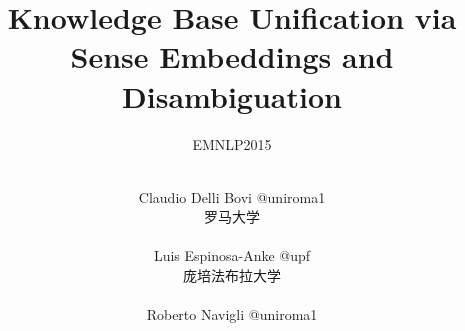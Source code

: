 \documentclass[xcolor=svgnames,dvipsnames,table, hyperref=pdftex, mathserif, presentation]{beamer}
\begin{document}
 
\title[KB Unification]{Knowledge Base Unification via Sense Embeddings and Disambiguation\\
}
\subtitle{EMNLP2015}

\author[Zhe Han]{\\ 
Claudio Delli Bovi @uniroma1 \begin{footnotesize}罗马大学\end{footnotesize}\\
Luis Espinosa-Anke @upf \begin{footnotesize}庞培法布拉大学\end{footnotesize}\\
Roberto Navigli @uniroma1\\
}

\frame[t,plain]{ \titlepage } %

\end{document}
